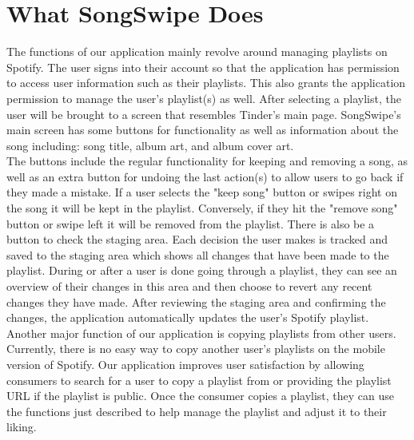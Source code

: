 \documentclass{article}
\begin{document}
\section{What SongSwipe Does}

\quad The functions of our application mainly revolve around managing playlists on Spotify. The user signs into their account so that the application has permission to access user information such as their playlists. This also grants the application permission to manage the user's playlist(s) as well. After selecting a playlist, the user will be brought to a screen that resembles Tinder's main page. SongSwipe's main screen has some buttons for functionality as well as information about the song including: song title, album art, and album cover art. \\

\quad The buttons include the regular functionality for keeping and removing a song, as well as an extra button for undoing the last action(s) to allow users to go back if they made a mistake. If a user selects the "keep song" button or swipes right on the song it will be kept in the playlist. Conversely, if they hit the "remove song" button or swipe left it will be removed from the playlist. There is also be a button to check the staging area. Each decision the user makes is tracked and saved to the staging area which shows all changes that have been made to the playlist. During or after a user is done going through a playlist, they can see an overview of their changes in this area and then choose to revert any recent changes they have made. After reviewing the staging area and confirming the changes, the application automatically updates the user's Spotify playlist. \\

\quad Another major function of our application is copying playlists from other users. Currently, there is no easy way to copy another user’s playlists on the mobile version of Spotify. Our application improves user satisfaction by allowing consumers to search for a user to copy a playlist from or providing the playlist URL if the playlist is public. Once the consumer copies a playlist, they can use the functions just described to help manage the playlist and adjust it to their liking.

\end{document}
